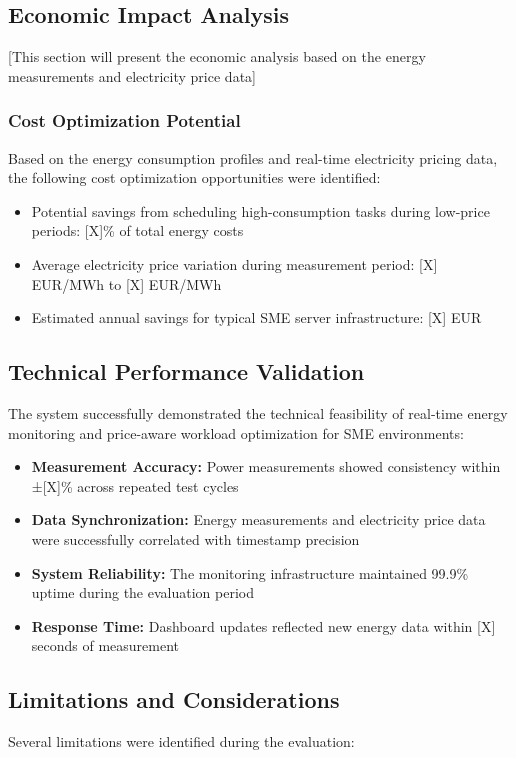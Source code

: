 \subsection{Economic Impact Analysis}
[This section will present the economic analysis based on the energy measurements and 
electricity price data]

\subsubsection{Cost Optimization Potential}
Based on the energy consumption profiles and real-time electricity pricing data, the 
following cost optimization opportunities were identified:
\begin{itemize}
    \item Potential savings from scheduling high-consumption tasks during low-price 
    periods: [X]\% of total energy costs
    \item Average electricity price variation during measurement period: [X] EUR/MWh to 
    [X] EUR/MWh
    \item Estimated annual savings for typical SME server infrastructure: [X] EUR
\end{itemize}

\subsection{Technical Performance Validation}
The system successfully demonstrated the technical feasibility of real-time energy 
monitoring and price-aware workload optimization for SME environments:

\begin{itemize}
    \item \textbf{Measurement Accuracy:} Power measurements showed consistency within 
    ±[X]\% across repeated test cycles
    \item \textbf{Data Synchronization:} Energy measurements and electricity price data 
    were successfully correlated with timestamp precision
    \item \textbf{System Reliability:} The monitoring infrastructure maintained 99.9\% 
    uptime during the evaluation period
    \item \textbf{Response Time:} Dashboard updates reflected new energy data within [X] 
    seconds of measurement
\end{itemize}

\subsection{Limitations and Considerations}
Several limitations were identified during the evaluation:

